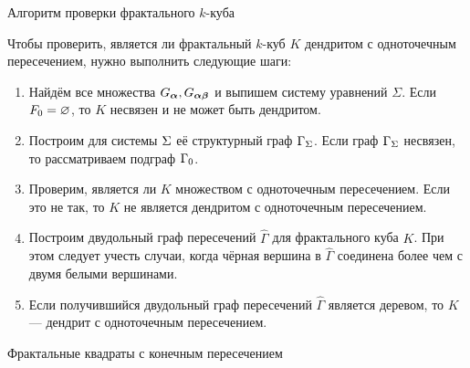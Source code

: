 \documentclass[aspectratio=1610, 10pt, notheorems]{beamer}
\begin{document}
\begin{frame}
\end{frame}


\begin{frame}{Алгоритм проверки фрактального $k$-куба}

Чтобы проверить, является ли фрактальный $k$-куб $K$ дендритом с одноточечным пересечением, нужно выполнить следующие шаги:

\begin{enumerate}

\item Найдём все множества $G_{\bm{\alpha}}, G_{{\bm{\alpha}}{\bm{\beta}}}$ и выпишем систему уравнений $\Sigma$.
Если $F_0=\varnothing$, то $K$ несвязен и не может быть дендритом.

\item Построим для системы $\Sigma$ её структурный граф $\Gamma_\Sigma$.
Если граф $\Gamma_\Sigma$ несвязен, то рассматриваем подграф $\Gamma_0$.
 
\item Проверим, является ли $K$ множеством с одноточечным пересечением.
Если это не так, то $K$ не является дендритом с одноточечным пересечением.
    
\item Построим двудольный граф пересечений $\hat\Gamma$ для фрактального куба $K$.
При этом следует учесть случаи, когда чёрная вершина в $\hat\Gamma$ соединена более чем с двумя белыми вершинами.

\item Если получившийся двудольный граф пересечений $\hat\Gamma$ является деревом, то $K$ --- дендрит с одноточечным пересечением.    
\end{enumerate}
\end{frame}


\begin{frame}{}
\Huge{Фрактальные квадраты с конечным пересечением}
\end{frame}
\end{document}
